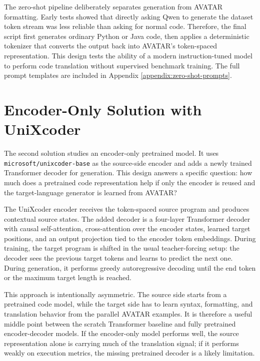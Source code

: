 The zero-shot pipeline deliberately separates generation from AVATAR
formatting. Early tests showed that directly asking Qwen to generate the
dataset token stream was less reliable than asking for normal code. Therefore,
the final script first generates ordinary Python or Java code, then applies a
deterministic tokenizer that converts the output back into AVATAR's
token-spaced representation. This design tests the ability of a modern
instruction-tuned model to perform code translation without supervised
benchmark training. The full prompt templates are included in Appendix
\ref{appendix:zero-shot-prompts}.

\section{Encoder-Only Solution with UniXcoder}

\quad The second solution studies an encoder-only pretrained model. It uses
\texttt{microsoft/}\allowbreak\texttt{unixcoder-base} \cite{guo2022unixcoder}
as the source-side encoder and adds a newly trained Transformer decoder for
generation. This design answers a specific question: how much does a pretrained
code representation help if only the encoder is reused and the target-language
generator is learned from AVATAR?

The UniXcoder encoder receives the token-spaced source program and produces
contextual source states. The added decoder is a four-layer Transformer decoder
with causal self-attention, cross-attention over the encoder states, learned
target positions, and an output projection tied to the encoder token
embeddings. During training, the target program is shifted in the usual
teacher-forcing setup: the decoder sees the previous target tokens and learns
to predict the next one. During generation, it performs greedy autoregressive
decoding until the end token or the maximum target length is reached.

This approach is intentionally asymmetric. The source side starts from a
pretrained code model, while the target side has to learn syntax, formatting,
and translation behavior from the parallel AVATAR examples. It is therefore a
useful middle point between the scratch Transformer baseline and fully
pretrained encoder-decoder models. If the encoder-only model performs well, the
source representation alone is carrying much of the translation signal; if it
performs weakly on execution metrics, the missing pretrained decoder is a likely
limitation.

